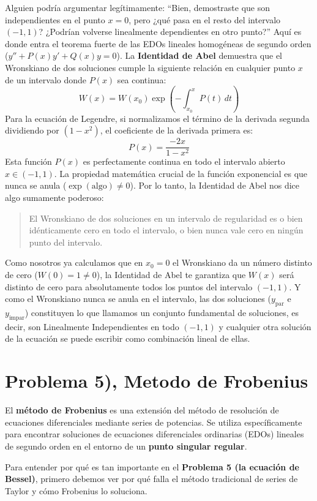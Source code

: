 \documentclass[11pt,spanish]{article}
\begin{document}
\begin{enumerate}
Alguien podría argumentar legítimamente: ``Bien, demostraste que son independientes en el punto $x=0$, pero ¿qué pasa en el resto del intervalo $(-1,1)$? ¿Podrían volverse linealmente dependientes en otro punto?''
Aquí es donde entra el teorema fuerte de las EDOs lineales homogéneas de segundo orden ($y'' + P(x)y' + Q(x)y = 0$). La {\bf Identidad de Abel} demuestra que el Wronskiano de dos soluciones cumple la siguiente relación en cualquier punto $x$ de un intervalo donde $P(x)$ sea continua:
$$W(x) = W(x_0) \exp\left( -\int_{x_0}^x P(t) \, dt \right)$$
Para la ecuación de Legendre, si normalizamos el término de la derivada segunda dividiendo por $(1-x^2)$, el coeficiente de la derivada primera es:
$$P(x) = \frac{-2x}{1-x^2}$$
Esta función $P(x)$ es perfectamente continua en todo el intervalo abierto $x \in (-1, 1)$.
La propiedad matemática crucial de la función exponencial es que nunca se anula ($\exp(\text{algo}) \neq 0$). Por lo tanto, la Identidad de Abel nos dice algo sumamente poderoso:
\begin{quotation}
El Wronskiano de dos soluciones en un intervalo de regularidad es o bien idénticamente cero en todo el intervalo, o bien nunca vale cero en ningún punto del intervalo.
\end{quotation}
Como nosotros ya calculamos que en $x_0=0$ el Wronskiano da un número distinto de cero ($W(0) = 1 \neq 0$), la Identidad de Abel te garantiza que $W(x)$ será distinto de cero para absolutamente todos los puntos del intervalo $(-1,1)$.
Y como el Wronskiano nunca se anula en el intervalo, las dos soluciones ($y_{\text{par}}$ e $y_{\text{impar}}$) constituyen lo que llamamos un conjunto fundamental de soluciones, es decir, son Linealmente Independientes en todo $(-1,1)$ y cualquier otra solución de la ecuación se puede escribir como combinación lineal de ellas.

\end{enumerate}

\section{Problema 5), Metodo de Frobenius}

El {\bf método de Frobenius} es una extensión del método de resolución de ecuaciones diferenciales mediante series de potencias. Se utiliza específicamente para encontrar soluciones de ecuaciones diferenciales ordinarias (EDOs) lineales de segundo orden en el entorno de un {\bf punto singular regular}.

Para entender por qué es tan importante en el {\bf Problema 5 (la ecuación de Bessel)}, primero debemos ver por qué falla el método tradicional de series de Taylor y cómo Frobenius lo soluciona.
\end{document}
